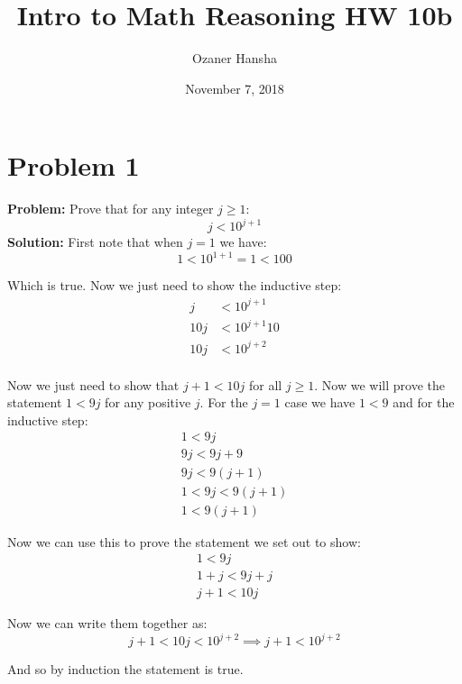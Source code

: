 \documentclass{article}
\begin{document}
\title{Intro to Math Reasoning HW 10b}
\author{Ozaner Hansha}
\date{November 7, 2018}
\maketitle

\section*{Problem 1}
\textbf{Problem:} Prove that for any integer $j\ge 1$:
$$j<10^{j+1}$$
\textbf{Solution:} First note that when $j=1$ we have:
$$1<10^{1+1}=1<100$$

Which is true. Now we just need to show the inductive step:
\begin{align*}
  j&<10^{j+1}\\
  10j&<10^{j+1}10\\
  10j&<10^{j+2}\\
\end{align*}

Now we just need to show that $j+1<10j$ for all $j\ge 1$. Now we will prove the statement $1<9j$ for any positive $j$. For the $j=1$ case we have $1<9$ and for the inductive step:
\begin{align*}
  1<9j\tag{given}\\
  9j<9j+9\\
  9j<9(j+1)\\
  1<9j<9(j+1)\\
  1<9(j+1)
\end{align*}

Now we can use this to prove the statement we set out to show:
\begin{align*}
  1<9j\tag{for any $j\ge1$}\\
  1+j<9j+j\\
  j+1<10j
\end{align*}

Now we can write them together as:
$$j+1<10j<10^{j+2}\implies j+1<10^{j+2}$$

And so by induction the statement is true.

%
\end{document}
